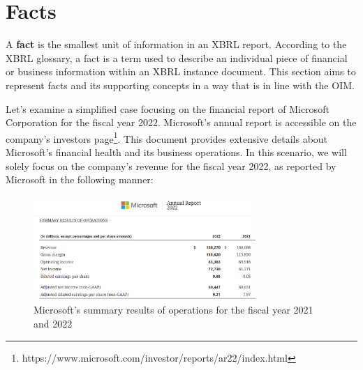 \section{Facts}
\label{sec:facts}

A \textbf{fact} is the smallest unit of information in an XBRL report. 
According to the XBRL glossary, a fact is a term used to describe an individual piece of financial or business information within an XBRL instance document\cite{xbrl_glossary}.
This section aims to represent facts and its supporting concepts in a way that is in line with the OIM.

Let's examine a simplified case focusing on the financial report of Microsoft Corporation for the fiscal year 2022.
Microsoft's annual report is accessible on the company's investors page\footnote{https://www.microsoft.com/investor/reports/ar22/index.html}.
This document provides extensive details about Microsoft's financial health and its business operations.
In this scenario, we will solely focus on the company's revenue for the fiscal year 2022,
as reported by Microsoft in the following manner:

\begin{figure}[H]
    \centering
    \includegraphics[width=0.75\textwidth]{images/microsoft_annual_report_2022.png}
\caption{Microsoft's summary results of operations for the fiscal year 2021 and 2022\cite{microsoft2022ar}}
    \label{fig:microsoft_annual_report_2022}
\end{figure}

